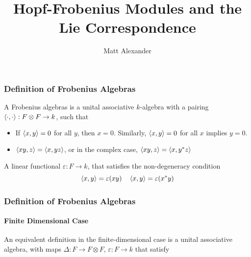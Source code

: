 \documentclass{beamer}
\title{Hopf-Frobenius Modules and the Lie Correspondence}
\author{Matt Alexander}
\begin{document}
\begin{frame}
\titlepage
\end{frame}








\begin{frame}

\frametitle{Definition of Frobenius Algebras}


A Frobenius algebras is a unital associative $k$-algebra with a pairing $\left\langle \cdot, \cdot \right\rangle: F \otimes F \to k$, such that

\begin{itemize}
\item {} If $\left\langle x,y \right\rangle = 0$ for all $y$, then $x = 0$. Similarly, $\left\langle x,y \right\rangle = 0$ for all $x$ implies $y=0$.

\item {} $\left\langle xy,z \right\rangle = \left\langle x,yz \right\rangle$, or in the complex case, $\left\langle xy,z \right\rangle = \left\langle x, y^* z \right\rangle$
\end{itemize}


 A linear functional $\varepsilon: F \to k$, that satisfies the non-degeneracy condition
\begin{equation*}
\left\langle x,y \right\rangle = \varepsilon(xy) \quad \left\langle x,y \right\rangle = \varepsilon(x^* y)
\end{equation*}


\end{frame}


\begin{frame}

\frametitle{Definition of Frobenius Algebras}

\framesubtitle{Finite Dimensional Case}

An equivalent definition in the finite-dimensional case is a unital associative algebra, with maps $\Delta: F \to F \otimes F$, $\varepsilon: F \to k$ that satisfy 

%


%




\end{frame}
\end{document}
